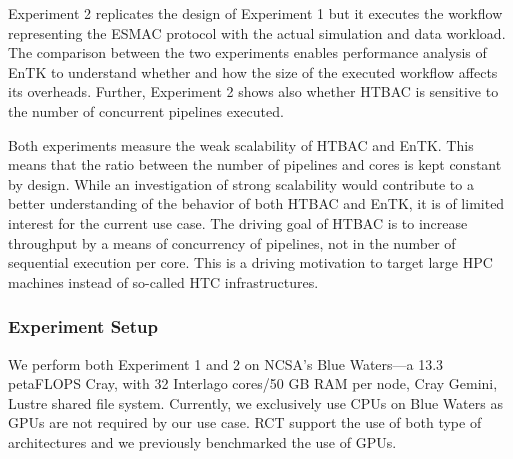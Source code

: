 Experiment 2 replicates the design of Experiment 1 but it executes the
workflow representing the ESMAC protocol with the actual simulation and data
workload. The comparison between the two experiments enables performance
analysis of EnTK to understand whether and how the size of the executed
workflow affects its overheads. Further, Experiment 2 shows also whether HTBAC
is sensitive to the number of concurrent pipelines executed.


Both experiments measure the weak scalability of HTBAC and EnTK\@. This means
that the ratio between the number of pipelines and cores is kept constant by
design. While an investigation of strong scalability would contribute to a
better understanding of the behavior of both HTBAC and EnTK, it is of limited
interest for the current use case. The driving goal of HTBAC is to increase
throughput by a means of concurrency of pipelines, not in the number of
sequential execution per core. This is a driving motivation to target large
HPC machines instead of so-called HTC infrastructures.


\subsubsection{Experiment Setup}\label{ssec:exp_setup}

We perform both Experiment 1 and 2 %
on NCSA's Blue Waters---a 13.3 petaFLOPS Cray, with 32 Interlago cores/50 GB RAM per node, Cray Gemini, Lustre
shared file system. Currently, we exclusively use CPUs on Blue Waters as GPUs
are not required by our use case. RCT support the use of both type of
architectures and we previously benchmarked the use of GPUs.




